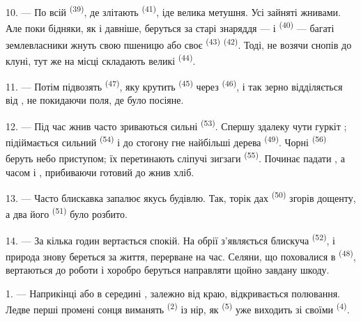 10. --- По всій  \textsuperscript{(39)}, де злітають
 \textsuperscript{(41)}, іде велика метушня. Усі зайняті
жнивами. Але поки бідняки, як і давніше, беруться за старі знаряддя ---
 і  \textsuperscript{(40)} --- багаті
землевласники жнуть свою пшеницю або своє  \textsuperscript{(43)}
 \textsuperscript{(42)}. Тоді, не возячи снопів до клуні, тут
же на місці складають великі  \textsuperscript{(44)}.

11. --- Потім підвозять  \textsuperscript{(47)}, яку крутить
 \textsuperscript{(45)} через 
\textsuperscript{(46)}, і так зерно відділяється від , не
покидаючи поля, де було посіяне.

\VUsaut{5.0mm}
\VUsaut{3.4mm}

12. --- Під час жнив часто зриваються сильні 
\textsuperscript{(53)}. Спершу здалеку чути гуркіт ; підіймається
сильний  \textsuperscript{(54)} і до стогону гне
найбільші дерева  \textsuperscript{(49)}. Чорні 
\textsuperscript{(56)} беруть небо приступом; їх перетинають сліпучі зигзаги
 \textsuperscript{(55)}. Починає падати , а часом і
, прибиваючи готовий до жнив хліб.

13. --- Часто блискавка запалює якусь будівлю. Так, торік дах 
\textsuperscript{(50)} згорів дощенту, а два його 
\textsuperscript{(51)} було розбито.

14. --- За кілька годин вертається спокій. На обрії з'являється блискуча
 \textsuperscript{(52)}, і природа знову береться за життя,
перерване на час. Селяни, що поховалися в 
\textsuperscript{(48)}, вертаються до роботи і хоробро беруться направляти щойно
завдану шкоду.

\VUsaut{6.0mm}
\VUsaut{3.6mm}

\VUsaut{1.4mm}
\VUsaut{4.0mm}

1. --- Наприкінці  або в середині , залежно від
краю, відкривається полювання. Ледве перші промені сонця виманять
 \textsuperscript{(2)} із нір, як 
\textsuperscript{(5)} уже виходить зі своїми 
\textsuperscript{(4)}.

